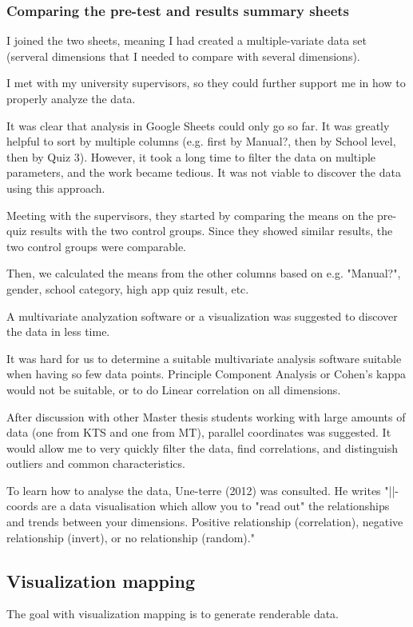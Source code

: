 \subsubsection{Comparing the pre-test and results summary sheets}

I joined the two sheets, meaning I had created a multiple-variate data set (serveral dimensions that I needed to compare with several dimensions).

I met with my university supervisors, so they could further support me in how to properly analyze the data.

It was clear that analysis in Google Sheets could only go so far. It was greatly helpful to sort by multiple columns (e.g. first by Manual?, then by School level, then by Quiz 3). However, it took a long time to filter the data on multiple parameters, and the work became tedious. It was not viable to discover the data using this approach.

Meeting with the supervisors, they started by comparing the means on the pre-quiz results with the two control groups. Since they showed similar results, the two control groups were comparable.

Then, we calculated the means from the other columns based on e.g. "Manual?", gender, school category, high app quiz result, etc.

A multivariate analyzation software or a visualization was suggested to discover the data in less time.

It was hard for us to determine a suitable multivariate analysis software suitable when having so few data points. Principle Component Analysis or Cohen's kappa would not be suitable, or to do Linear correlation on all dimensions.

After discussion with other Master thesis students working with large amounts of data (one from KTS and one from MT), parallel coordinates was suggested. It would allow me to very quickly filter the data, find correlations, and distinguish outliers and common characteristics.

To learn how to analyse the data, Une-terre (2012) was consulted. %
He writes "||-coords are a data visualisation which allow you to "read out" the relationships and trends between your dimensions. Positive relationship (correlation), negative relationship (invert), or no relationship (random)."

\subsection{Visualization mapping}
The goal with visualization mapping is to generate renderable data.

